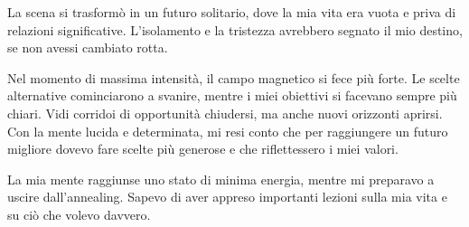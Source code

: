 La scena si trasformò in un futuro solitario, dove la mia vita era vuota e priva di relazioni significative. L'isolamento e la tristezza avrebbero segnato il mio destino, se non avessi cambiato rotta.

Nel momento di massima intensità, il campo magnetico si fece più forte. Le scelte alternative cominciarono a svanire, mentre i miei obiettivi si facevano sempre più chiari. Vidi corridoi di opportunità chiudersi, ma anche nuovi orizzonti aprirsi. Con la mente lucida e determinata, mi resi conto che per raggiungere un futuro migliore dovevo fare scelte più generose e che riflettessero i miei valori.

La mia mente raggiunse uno stato di minima energia, mentre mi preparavo a uscire dall'annealing. Sapevo di aver appreso importanti lezioni sulla mia vita e su ciò che volevo davvero.



